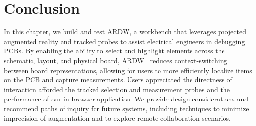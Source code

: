 \documentclass [11pt, proquest] {uwthesis}[2020/02/24]
\newcommand{\ARDWname}{ARDW}
\begin{document}

    

\section{Conclusion}
\label{sec:conclusion}


In this chapter, we build and test \ARDWname, a workbench that leverages projected augmented reality and tracked probes to assist electrical engineers in debugging PCBs. By enabling the ability to select and highlight elements across the schematic, layout, and physical board, \ARDWname~ reduces context-switching between board representations, allowing for users to more efficiently localize items on the PCB and capture measurements. Users appreciated the directness of interaction afforded the tracked selection and measurement probes and the performance of our in-browser application. We provide design considerations and recommend paths of inquiry for future systems, including  techniques to minimize imprecision of augmentation and to explore remote collaboration scenarios.
\end{document}
